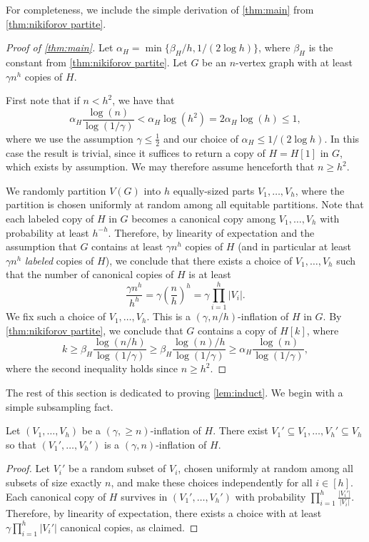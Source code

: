 \documentclass[11pt]{article}
\numberwithin{equation}{section}
\theoremstyle{plain}
\theoremstyle{remark}
\newcommand\ab[1]{\lvert #1 \rvert}
\begin{document}
For completeness, we include the simple derivation of \cref{thm:main} from \cref{thm:nikiforov partite}.
\begin{proof}[Proof of \cref{thm:main}]
    Let $\alpha_H = \min \{\beta_H/h, 1/(2\log h)\}$, where $\beta_H$ is the constant from \cref{thm:nikiforov partite}. Let $G$ be an $n$-vertex graph with at least $\gamma n^h$ copies of $H$.

    First note that if $n <h^2$, we have that
    \[
    \alpha_H \frac{\log(n)}{\log(1/\gamma)} < \alpha_H \log(h^2)= 2\alpha_H \log(h) \leq 1,
    \]
    where we use the assumption $\gamma \leq \frac 12$ and our choice of $\alpha_H \leq 1/(2\log h)$. In this case the result is trivial, since it suffices to return a copy of $H=H[1]$ in $G$, which exists by assumption. We may therefore assume henceforth that $n \geq h^2$.
    
    We randomly partition $V(G)$ into $h$ equally-sized parts $V_1,\dots,V_h$, where the partition is chosen uniformly at random among all equitable partitions. Note that each labeled copy of $H$ in $G$ becomes a canonical copy among $V_1,\dots,V_h$ with probability at least $h^{-h}$. Therefore, by linearity of expectation and the assumption that $G$ contains at least $\gamma n^h$ copies of $H$ (and in particular at least $\gamma n^h$ \emph{labeled} copies of $H$), we conclude that there exists a choice of $V_1,\dots,V_h$ such that the number of canonical copies of $H$ is at least
    \[
        \frac{\gamma n^h}{h^h} = \gamma \left( \frac nh \right)^h=\gamma \prod_{i=1}^h \ab{V_i}.
    \]
    We fix such a choice of $V_1,\dots,V_h$. This is a $(\gamma,n/h)$-inflation of $H$ in $G$. By \cref{thm:nikiforov partite}, we conclude that $G$ contains a copy of $H[k]$, where
    \[
    k \geq \beta_H \frac{\log(n/h)}{\log(1/\gamma)} \geq \beta_H \frac{\log(n)/h}{\log(1/\gamma)} \geq \alpha_H \frac{\log(n)}{\log(1/\gamma)},
    \]
    where the second inequality holds since $n \geq h^2$.
\end{proof}
The rest of this section is dedicated to proving \cref{lem:induct}. 
We begin with a simple subsampling fact.
\begin{lemma}\label{lem:subsample}
    Let $(V_1,\dots,V_h)$ be a $(\gamma, \geq n)$-inflation of $H$. There exist $V_1'\subseteq V_1,\dots,V_h'\subseteq V_h$ so that $(V_1',\dots,V_h')$ is a $(\gamma,n)$-inflation of $H$.
\end{lemma}
\begin{proof}
    Let $V_i'$ be a random subset of $V_i$, chosen uniformly at random among all subsets of size exactly $n$, and make these choices independently for all $i \in [h]$. Each canonical copy of $H$ survives in $(V_1',\dots,V_h')$ with probability $\prod_{i=1}^h \frac{\ab{V_i'}}{\ab{V_i}}$. Therefore, by linearity of expectation, there exists a choice with at least $\gamma \prod_{i=1}^h \ab{V_i'}$ canonical copies, as claimed.
\end{proof}
\end{document}
